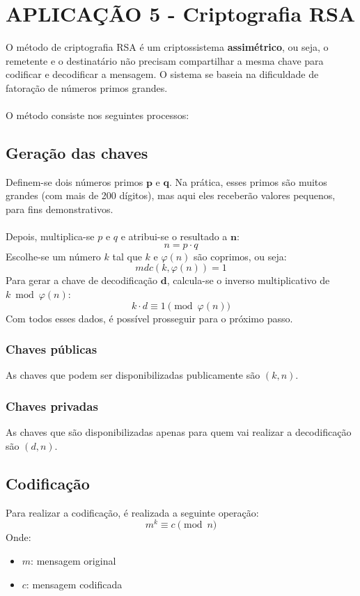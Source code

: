 \section{APLICAÇÃO 5 - Criptografia RSA}
O método de criptografia RSA é um criptossistema \textbf{assimétrico}, ou seja, o remetente e o destinatário não precisam compartilhar a mesma chave para codificar e decodificar a mensagem. O sistema se baseia na dificuldade de fatoração de números primos grandes.\\\\
O método consiste nos seguintes processos:

\subsection{Geração das chaves}
Definem-se dois números primos $\mathbf{p}$ e $\mathbf{q}$. Na prática, esses primos são muitos grandes (com mais de 200 dígitos), mas aqui eles receberão valores pequenos, para fins demonstrativos.\\\\
Depois, multiplica-se $p$ e $q$ e atribui-se o resultado a $\mathbf{n}$:
\[
    n = p \cdot q
\]
Escolhe-se um número $k$ tal que $k$ e $\varphi(n)$ são coprimos, ou seja:
\[
    mdc(k, \varphi(n)) = 1
\]
Para gerar a chave de decodificação $\mathbf{d}$, calcula-se o inverso multiplicativo de $k \bmod \varphi(n)$:
\[
    k \cdot d \equiv 1 \pmod{\varphi(n)}
\]
Com todos esses dados, é possível prosseguir para o próximo passo.

\vspace{24pt}
\subsubsection{Chaves públicas}
As chaves que podem ser disponibilizadas publicamente são $(k,n)$.

\subsubsection{Chaves privadas}
As chaves que são disponibilizadas apenas para quem vai realizar a decodificação são $(d,n)$.

\subsection{Codificação}
Para realizar a codificação, é realizada a seguinte operação:
\[
    m^{k} \equiv c \pmod {n}
\]
Onde:
\begin{itemize}
    \item $m$: mensagem original
    \item $c$: mensagem codificada
\end{itemize}


